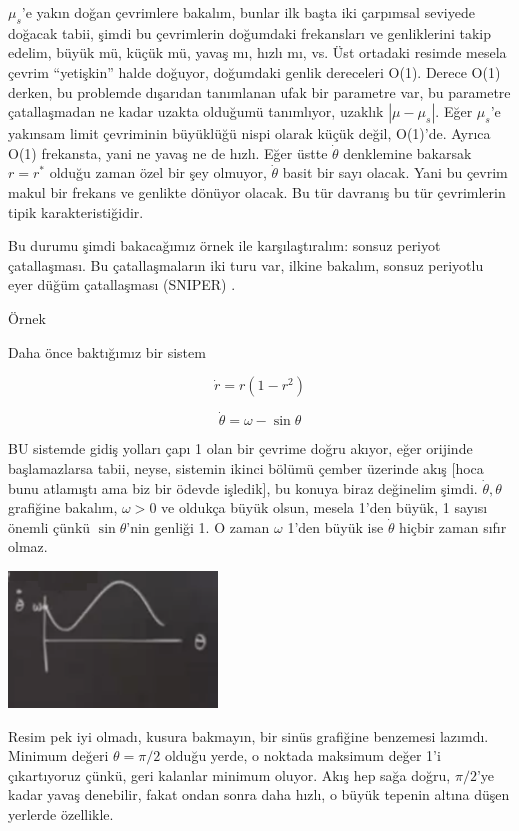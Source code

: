 \documentclass[12pt,fleqn]{article}\usepackage{../../common}
\begin{document}
$\mu_s$'e yakın doğan çevrimlere bakalım, bunlar ilk başta iki çarpımsal
seviyede doğacak tabii, şimdi bu çevrimlerin doğumdaki frekansları ve
genliklerini takip edelim, büyük mü, küçük mü, yavaş mı, hızlı mı, vs. Üst
ortadaki resimde mesela çevrim ``yetişkin'' halde doğuyor, doğumdaki genlik
dereceleri O(1). Derece O(1) derken, bu problemde dışarıdan tanımlanan ufak
bir parametre var, bu parametre çatallaşmadan ne kadar uzakta olduğumü
tanımlıyor, uzaklık $|\mu - \mu_s|$. Eğer $\mu_s$'e yakınsam limit
çevriminin büyüklüğü nispi olarak küçük değil, O(1)'de. Ayrıca O(1)
frekansta, yani ne yavaş ne de hızlı. Eğer üstte $\dot{\theta}$ denklemine
bakarsak $r = r^\ast$ olduğu zaman özel bir şey olmuyor, $\dot{\theta}$ basit
bir sayı olacak. Yani bu çevrim makul bir frekans ve genlikte dönüyor
olacak. Bu tür davranış bu tür çevrimlerin tipik karakteristiğidir.

Bu durumu şimdi bakacağımız örnek ile karşılaştıralım: sonsuz periyot
çatallaşması. Bu çatallaşmaların iki turu var, ilkine bakalım, sonsuz
periyotlu eyer düğüm çatallaşması (SNIPER) . 

Örnek

Daha önce baktığımız bir sistem

$$ \dot{r} = r (1-r^2) $$

$$ \dot{\theta} = \omega - \sin\theta $$

BU sistemde gidiş yolları çapı 1 olan bir çevrime doğru akıyor, eğer
orijinde başlamazlarsa tabii, neyse, sistemin ikinci bölümü çember üzerinde
akış [hoca bunu atlamıştı ama biz bir ödevde işledik], bu konuya biraz
değinelim şimdi. $\dot{\theta},\theta$ grafiğine bakalım, $\omega > 0$ ve
oldukça büyük olsun, mesela 1'den büyük, 1 sayısı önemli çünkü
$\sin\theta$'nin genliği 1. O zaman $\omega$ 1'den büyük ise $\dot{\theta}$
hiçbir zaman sıfır olmaz. 

\includegraphics[width=15em]{14_07.png}

Resim pek iyi olmadı, kusura bakmayın, bir sinüs grafiğine benzemesi
lazımdı. Minimum değeri $\theta=\pi/2$ olduğu yerde, o noktada maksimum
değer 1'i çıkartıyoruz çünkü, geri kalanlar minimum oluyor. Akış hep sağa
doğru, $\pi/2$'ye kadar yavaş denebilir, fakat ondan sonra daha hızlı, o
büyük tepenin altına düşen yerlerde özellikle.
\end{document}
